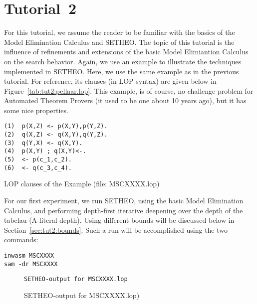 %

\section{Tutorial~2}

For this tutorial, we assume the reader to be familiar with the
basics of the Model Elimination Calculus and SETHEO. The topic
of this tutorial is the influence of refinements and extensions
of the basic Model Elimiantion Calculus on the search behavior.
Again, we use an example to illustrate the techniques implemented in
SETHEO. Here, we use the same example as in the previous tutorial.
For reference, its clauses (in LOP syntax) are given below in 
Figure~\ref{tab:tut2:pellaar.lop}. This example, is of course, no
challenge problem for Automated Theorem Provers
(it used to be one about 10 years ago), but it has some nice 
properties.


\begin{table}[htb]
\begin{center}
\begin{verbatim}
(1)  p(X,Z) <- p(X,Y),p(Y,Z).
(2)  q(X,Z) <- q(X,Y),q(Y,Z).
(3)  q(Y,X) <- q(X,Y).
(4)  p(X,Y) ; q(X,Y)<-.
(5)  <- p(c_1,c_2).
(6)  <- q(c_3,c_4).
\end{verbatim}
\end{center}
\caption{LOP clauses of the Example (file: MSCXXXX.lop)}
\label{tab:tut2:pellaar.lop}
\end{table}

For our first experiment, we run SETHEO, using the basic Model Elimination
Calculus, and performing depth-first iterative deepening over the
depth of the tabelau (A-literal depth). Using different bounds
will be discussed below in Section~\ref{sec:tut2:bounds}.
Such a run will be accomplished using the two commands:

\begin{center}
\begin{verbatim}
inwasm MSCXXXX
sam -dr MSCXXXX
\end{verbatim}
\end{center}

\begin{figure}[htb]
\begin{center}
\begin{verbatim}
SETHEO-output for MSCXXXX.lop
\end{verbatim}
\end{center}
\caption{SETHEO-output for MSCXXXX.lop)}
\label{fig:tut2:pellaar.pure.log}
\end{figure}

